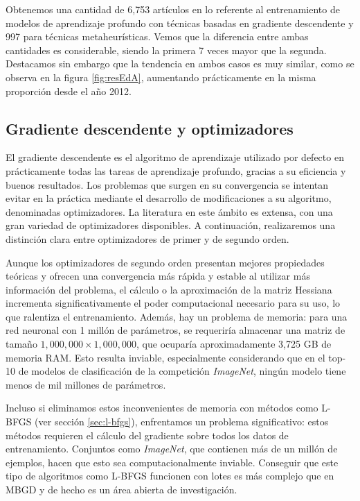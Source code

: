 Obtenemos una cantidad de 6,753 artículos en lo referente al entrenamiento de modelos de aprendizaje profundo con técnicas basadas en gradiente descendente y 997 para técnicas metaheurísticas. Vemos que la diferencia entre ambas cantidades es considerable, siendo la primera 7 veces mayor que la segunda. Destacamos sin embargo que la tendencia en ambos casos es muy similar, como se observa en la figura \ref{fig:resEdA}, aumentando prácticamente en la misma proporción desde el año 2012.



\subsection{Gradiente descendente y optimizadores}

El gradiente descendente es el algoritmo de aprendizaje utilizado por defecto en prácticamente todas las tareas de aprendizaje profundo, gracias a su eficiencia y buenos resultados. Los problemas que surgen en su convergencia se intentan evitar en la práctica mediante el desarrollo de modificaciones a su algoritmo, denominadas optimizadores. La literatura en este ámbito es extensa, con una gran variedad de optimizadores disponibles. A continuación, realizaremos una distinción clara entre optimizadores de primer y de segundo orden.


Aunque los optimizadores de segundo orden presentan mejores propiedades teóricas y ofrecen una convergencia más rápida y estable al utilizar más información del problema, el cálculo o la aproximación de la matriz Hessiana incrementa significativamente el poder computacional necesario para su uso, lo que ralentiza el entrenamiento. Además, hay un problema de memoria: para una red neuronal con 1 millón de parámetros, se requeriría almacenar una matriz de tamaño $1,000,000 \times 1,000,000$, que ocuparía aproximadamente 3,725 GB de memoria RAM. Esto resulta inviable, especialmente considerando que en el top-10 de modelos de clasificación de la competición \textit{ImageNet}, ningún modelo tiene menos de mil millones de parámetros.

Incluso si eliminamos estos inconvenientes de memoria con métodos como L-BFGS (ver sección \ref{sec:l-bfgs}), enfrentamos un problema significativo: estos métodos requieren el cálculo del gradiente sobre todos los datos de entrenamiento. Conjuntos como \textit{ImageNet}, que contienen más de un millón de ejemplos, hacen que esto sea computacionalmente inviable. Conseguir que este tipo de algoritmos como L-BFGS funcionen con lotes es más complejo que en MBGD y de hecho es un área abierta de investigación.

